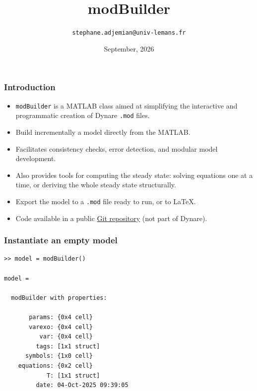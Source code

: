 \documentclass[10pt,slidestop]{beamer}
\theoremstyle{plain}
\begin{document}
\title{modBuilder}
\author[]{\texttt{stephane.adjemian@univ-lemans.fr}}
\date{September, 2026}

\begin{frame}
  \titlepage{}
\end{frame}

\begin{frame}[fragile]
  \frametitle{Introduction}

  \bigskip

  \begin{itemize}

  \item \verb+modBuilder+ is a MATLAB class aimed at simplifying the interactive and
    programmatic creation of Dynare \verb+.mod+ files.\newline

  \item Build incrementally a model directly from the MATLAB.\newline

  \item Facilitates consistency checks, error detection, and modular
    model development.\newline

  \item Also provides tools for computing the steady state: solving equations
    one at a time, or deriving the whole steady state structurally.\newline

  \item Export the model to a \verb+.mod+ file ready to run, or to LaTeX.\newline

  \item Code available in a public \href{https://git.dynare.org/stepan-a/modbuilder}{Git repository} (not part of Dynare).

  \end{itemize}

\end{frame}


\begin{frame}[fragile]
  \frametitle{Instantiate an empty model}

\begin{lstlisting}[style=MatlabConsole]
>> model = modBuilder()

model =

  modBuilder with properties:

       params: {0x4 cell}
       varexo: {0x4 cell}
          var: {0x4 cell}
         tags: [1x1 struct]
      symbols: {1x0 cell}
    equations: {0x2 cell}
            T: [1x1 struct]
         date: 04-Oct-2025 09:39:05
   \end{lstlisting}

\end{frame}
\end{document}
